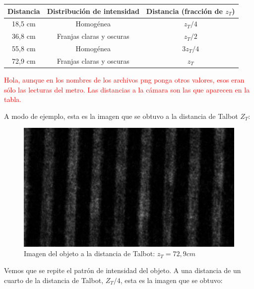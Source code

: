 \documentclass[12pt,a5paper]{article}
\begin{document}
\begin{center}
    \begin{tabular}{|c|c|c|} \hline
        Distancia & Distribución de intensidad & Distancia (fracción de $z_T$)\\ \hline
        18,5 cm & Homogénea & $z_T/4$\\ \hline
        36,8 cm & Franjas claras y oscuras & $z_T/2$\\ \hline
        55,8 cm & Homogénea & $3z_T/4$\\ \hline
        72,9 cm & Franjas claras y oscuras & $z_T$\\ \hline
    \end{tabular}
\end{center}

\textcolor{red}{Hola, aunque en los nombres de los archivos png ponga otros valores, esos eran sólo las lecturas del metro. Las distancias a la cámara son las que aparecen en la tabla.}

A modo de ejemplo, esta es la imagen que se obtuvo a la distancia de Talbot $Z_T$:

\begin{figure}[h!]
    \centering
    \includegraphics[scale=0.15]{54.8-2a-talbot.png}
    \caption{Imagen del objeto a la distancia de Talbot: $z_T = 72,9 cm$}
    \label{fig:imagen-zt}
\end{figure}

Vemos que se repite el patrón de intensidad del objeto. A una distancia de un cuarto de la distancia de Talbot, $Z_T/4$, esta es la imagen que se obtuvo:
\end{document}
